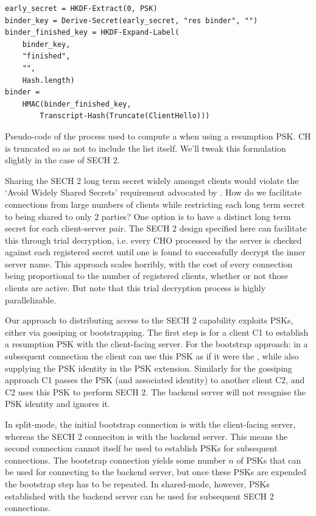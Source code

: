 \begin{listing}
    \begin{Verbatim}[frame=single]
early_secret = HKDF-Extract(0, PSK)
binder_key = Derive-Secret(early_secret, "res binder", "")
binder_finished_key = HKDF-Expand-Label(
    binder_key,
    "finished",
    "",
    Hash.length)
binder =
    HMAC(binder_finished_key,
        Transcript-Hash(Truncate(ClientHello)))
    \end{Verbatim}
    \captionsetup{width=.8\linewidth} 
    \caption[Pseudo-code for Computation of  ]{\label{lst:binder-pseudocode}Pseudo-code of the process used to compute a  when using a resumption PSK. \ac{CH} is truncated so as not to include the  list itself. We'll tweak this formulation slightly in the case of \ac{SECH} 2.}
\end{listing}




Sharing the \ac{SECH} 2 long term secret widely amongst clients would violate the `Avoid Widely Shared Secrets' requirement advocated by \citep{rfc8744-issues}.
How do we facilitate connections from large numbers of clients while restricting each long term secret to being shared to only 2 parties?
One option is to have a distinct long term secret for each client-server pair.
The \ac{SECH} 2 design specified here can facilitate this through trial decryption,
i.e. every \ac{CHO} processed by the server
is checked against each registered secret
until one is found to successfully decrypt the inner server name.
This approach scales horribly,
with the cost of every connection being proportional to the number of registered clients,
whether or not those clients are active.
But note that this trial decryption process is highly parallelizable.

Our approach to distributing access to the \ac{SECH} 2 capability
exploits \ac{PSK}s,
either via gossiping or bootstrapping.
The first step is for a client C1 to establish a resumption \ac{PSK} with
the client-facing server.
For the bootstrap approach: in a subsequent connection the client can use this \ac{PSK}
as if it were the \varsechlongtermkey{}, while also supplying
the \ac{PSK} identity in the \ac{PSK} extension.
Similarly for the gossiping approach C1 passes the \ac{PSK} (and associated identity)
to another client C2, and C2 uses this \ac{PSK} to perform \ac{SECH} 2.
The backend server will not recognise the \ac{PSK} identity and ignores it.

In split-mode, the initial bootstrap connection is with the client-facing server, whereas
the \ac{SECH} 2 conneciton is with the backend server. This means the second connection
cannot itself be used to establish \ac{PSK}s for subsequent connections.
The bootstrap connection yields some number $n$ of \ac{PSK}s that can be used for connecting
to the backend server, but once these \ac{PSK}s are expended the bootstrap step has to be repeated.
In shared-mode, however, \ac{PSK}s established with the backend server can be used
for subsequent \ac{SECH} 2 connections.
